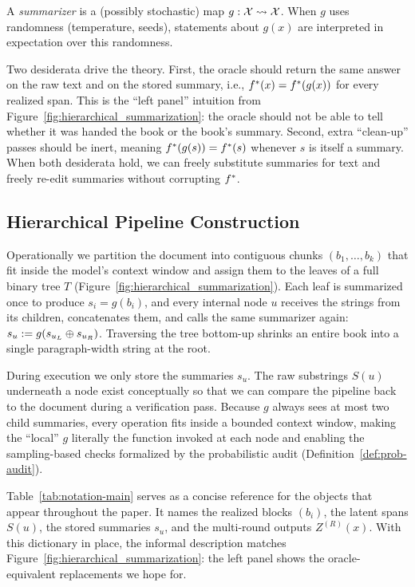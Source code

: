 \begin{definition}[Summarizer]\label{def:summarizer}
A \emph{summarizer} is a (possibly stochastic) map $g: \mathcal{X} \rightsquigarrow \mathcal{X}$. When $g$ uses randomness (temperature, seeds), statements about $g(x)$ are interpreted in expectation over this randomness.
\end{definition}

Two desiderata drive the theory. First, the oracle should return the same answer on the raw text and on the stored summary, i.e., $f^{\ast}(x) = f^{\ast}(g(x))$ for every realized span. This is the ``left panel'' intuition from Figure~\ref{fig:hierarchical_summarization}: the oracle should not be able to tell whether it was handed the book or the book's summary. Second, extra ``clean-up'' passes should be inert, meaning $f^{\ast}(g(s)) = f^{\ast}(s)$ whenever $s$ is itself a summary. When both desiderata hold, we can freely substitute summaries for text and freely re-edit summaries without corrupting $f^{\ast}$.

\subsection{Hierarchical Pipeline Construction}

Operationally we partition the document into contiguous chunks $(b_1,\dots,b_k)$ that fit inside the model's context window and assign them to the leaves of a full binary tree $T$ (Figure~\ref{fig:hierarchical_summarization}). Each leaf is summarized once to produce $s_i = g(b_i)$, and every internal node $u$ receives the strings from its children, concatenates them, and calls the same summarizer again: $s_u := g(s_{u_L} \oplus s_{u_R})$. Traversing the tree bottom-up shrinks an entire book into a single paragraph-width string at the root.

During execution we only store the summaries $s_u$. The raw substrings $S(u)$ underneath a node exist conceptually so that we can compare the pipeline back to the document during a verification pass. Because $g$ always sees at most two child summaries, every operation fits inside a bounded context window, making the ``local'' $g$ literally the function invoked at each node and enabling the sampling-based checks formalized by the probabilistic audit (Definition~\ref{def:prob-audit}).

Table~\ref{tab:notation-main} serves as a concise reference for the objects that appear throughout the paper. It names the realized blocks $(b_i)$, the latent spans $S(u)$, the stored summaries $s_u$, and the multi-round outputs $Z^{(R)}(x)$. With this dictionary in place, the informal description matches Figure~\ref{fig:hierarchical_summarization}: the left panel shows the oracle-equivalent replacements we hope for.


